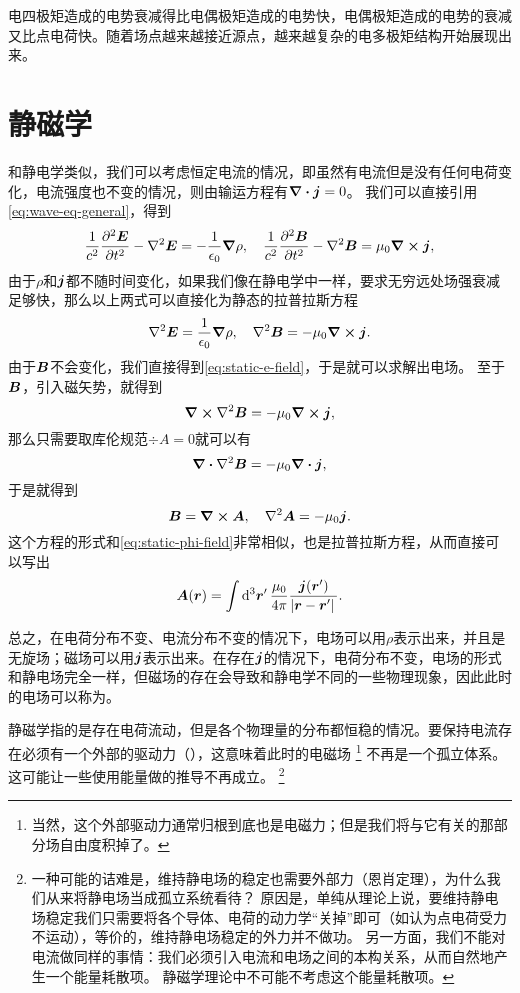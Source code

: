 电四极矩造成的电势衰减得比电偶极矩造成的电势快，电偶极矩造成的电势的衰减又比点电荷快。随着场点越来越接近源点，越来越复杂的电多极矩结构开始展现出来。

\chapter{静磁学}

和静电学类似，我们可以考虑恒定电流的情况，即虽然有电流但是没有任何电荷变化，电流强度也不变的情况，则由输运方程有$\div{\vb*{j}}=0$。
我们可以直接引用\eqref{eq:wave-eq-general}，得到
\[
    \frac{1}{c^2} \pdv[2]{\vb*{E}}{t} - \laplacian{\vb*{E}} = - \frac{1}{\epsilon_0} \grad{\rho} , \quad \frac{1}{c^2} \pdv[2]{\vb*{B}}{t} - \laplacian{\vb*{B}} = \mu_0 \curl{\vb*{j}},
\]
由于$\rho$和$\vb*{j}$都不随时间变化，如果我们像在静电学中一样，要求无穷远处场强衰减足够快，那么以上两式可以直接化为静态的拉普拉斯方程
\[
    \laplacian{\vb*{E}} = \frac{1}{\epsilon_0} \grad{\rho}, \quad \laplacian{\vb*{B}} = - \mu_0 \curl{\vb*{j}}.
\]
由于$\vb*{B}$不会变化，我们直接得到\eqref{eq:static-e-field}，于是就可以求解出电场。
至于$\vb*{B}$，引入磁矢势，就得到
\[
    \curl{\laplacian{\vb*{B}}} = - \mu_0 \curl{\vb*{j}},
\]
那么只需要取库伦规范$\div{A}=0$就可以有
\[
    \div{\laplacian{\vb*{B}}} = - \mu_0 \div{\vb*{j}},
\]
于是就得到
\begin{equation}
    \vb*{B} = \curl{\vb*{A}}, \quad \laplacian{\vb*{A}} = - \mu_0 \vb*{j}.
\end{equation}
这个方程的形式和\eqref{eq:static-phi-field}非常相似，也是拉普拉斯方程，从而直接可以写出
\begin{equation}
    \vb*{A}(\vb*{r}) = \int \dd[3]{\vb*{r}'} \frac{\mu_0}{4\pi} \frac{\vb*{j}(\vb*{r}')}{\abs*{\vb*{r} - \vb*{r}'}}.
    \label{eq:from-j-to-a}
\end{equation}

总之，在电荷分布不变、电流分布不变的情况下，电场可以用$\rho$表示出来，并且是无旋场；磁场可以用$\vb*{j}$表示出来。在存在$\vb*{j}$的情况下，电荷分布不变，电场的形式和静电场完全一样，但磁场的存在会导致和静电学不同的一些物理现象，因此此时的电场可以称为。

静磁学指的是存在电荷流动，但是各个物理量的分布都恒稳的情况。要保持电流存在必须有一个外部的驱动力（），这意味着此时的电磁场%
\footnote{
    当然，这个外部驱动力通常归根到底也是电磁力；但是我们将与它有关的那部分场自由度积掉了。
}%
不再是一个孤立体系。这可能让一些使用能量做的推导不再成立。%
\footnote{
    一种可能的诘难是，维持静电场的稳定也需要外部力（恩肖定理），为什么我们从来将静电场当成孤立系统看待？
    原因是，单纯从理论上说，要维持静电场稳定我们只需要将各个导体、电荷的动力学“关掉”即可（如认为点电荷受力不运动），等价的，维持静电场稳定的外力并不做功。
    另一方面，我们不能对电流做同样的事情：我们必须引入电流和电场之间的本构关系，从而自然地产生一个能量耗散项。
    静磁学理论中不可能不考虑这个能量耗散项。
}%


